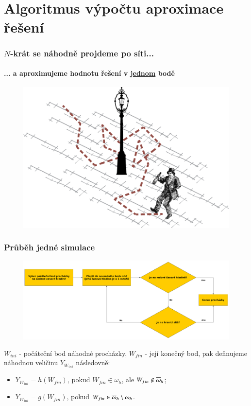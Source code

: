 \section{Algoritmus výpočtu aproximace řešení}

\begin{frame}\frametitle{$N$-krát se náhodně projdeme po síti...}
\framesubtitle{... a aproximujeme hodnotu řešení v \underline{jednom} bodě}
	\begin{figure}
		\centering
		\includegraphics[width=0.8\linewidth]{../Figs/random_walk}
		\label{fig:random_walk}
	\end{figure}
\end{frame}

\begin{frame}\frametitle{Průběh jedné simulace}
	\begin{figure}
		\centering
		\includegraphics[width=1\linewidth]{../Figs/algorithm}
		\label{fig:algorithm}
	\end{figure}

	$W_{ini}$ - počáteční bod náhodné procházky, $W_{fin}$ - její konečný bod, pak definujeme náhodnou veličinu $Y_{W_{ini}}$ následovně:
	\begin{itemize}
		\item $Y_{W_{ini}}=h(W_{fin})$, pokud $W_{fin}\in\omega_{h}$, ale $W_{fin}\notin\overline{\omega}_{h}$;
		\item $Y_{W_{ini}}=g(W_{fin})$, pokud $W_{fin}\in\overline{\omega}_{h}\setminus\omega_{h}$.
	\end{itemize}
\end{frame}



